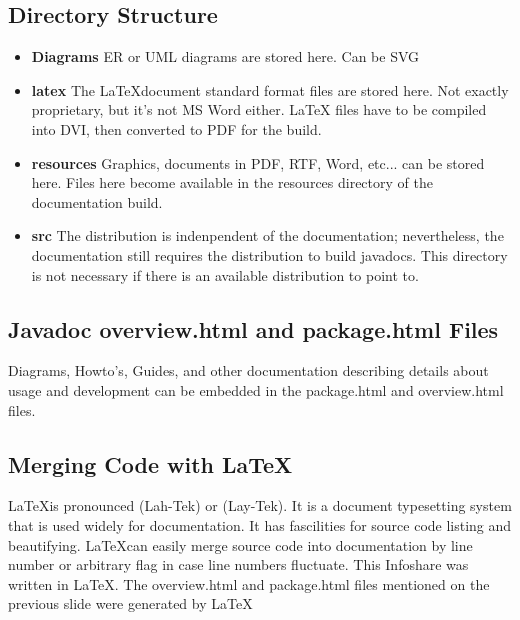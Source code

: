\documentclass[12pt,notitlepage]{article}
\begin{document}
\begin{s5presentation}
\begin{ifhtml}
\begin{s5slide}
        \section{Directory Structure}
        \begin{itemize}
      \item \textbf{Diagrams}
        ER or UML diagrams are stored here. Can be SVG
      \item \textbf{latex}
        The \LaTeX document standard format files are stored here. Not exactly proprietary, but
        it's not MS Word either. LaTeX files have to be compiled into DVI, then converted to PDF for
        the build.
      \item \textbf{resources}
          Graphics, documents in PDF, RTF, Word, etc... can be stored here. Files here become
          available in the resources directory of the documentation build.
        \item \textbf{src}
          The distribution is indenpendent of the documentation; nevertheless, the 
          documentation still requires the distribution to build javadocs. This directory 
          is not necessary if there is an available distribution to point to.
      \end{itemize}
      \end{s5slide}
    \begin{s5slide}
      \section{Javadoc overview.html and package.html Files}
      Diagrams, Howto's, Guides, and other documentation describing details about usage and development 
      can be embedded in the package.html and overview.html files.
    \end{s5slide}
    \begin{s5slide}
      \section{Merging Code with \LaTeX}
      \LaTeX is pronounced (Lah-Tek) or (Lay-Tek). It is a document typesetting system that is used 
      widely for documentation. It has fascilities for source code listing and beautifying. \LaTeX can
      easily merge source code into documentation by line number or arbitrary flag in case line numbers
      fluctuate.
      This Infoshare was written in \LaTeX. The overview.html and package.html files mentioned on the 
      previous slide were generated by \LaTeX
    \end{s5slide}
    \begin{s5slide}
      \begin{slideshow}
        \item {}
        \item {}
      \end{slideshow}
    \end{s5slide}
  \end{ifhtml}
  \W \end{s5presentation}
\end{document}
